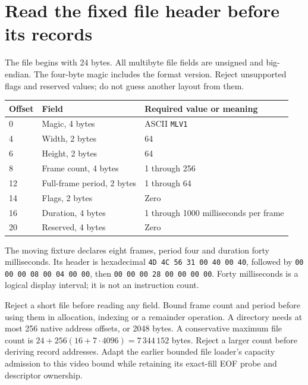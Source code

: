 \section{Read the fixed file header before its records}
The file begins with 24 bytes. All multibyte file fields are unsigned and big-endian.
The four-byte magic includes the format version. Reject unsupported flags and
reserved values; do not guess another layout from them.
\begin{longtable}{p{18mm}p{42mm}p{86mm}}
  \toprule Offset & Field                      & Required value or meaning             \\\midrule
  0               & Magic, 4 bytes             & ASCII \texttt{MLV1}                   \\
  4               & Width, 2 bytes             & 64                                    \\
  6               & Height, 2 bytes            & 64                                    \\
  8               & Frame count, 4 bytes       & 1 through 256                         \\
  12              & Full-frame period, 2 bytes & 1 through 64                          \\
  14              & Flags, 2 bytes             & Zero                                  \\
  16              & Duration, 4 bytes          & 1 through 1000 milliseconds per frame \\
  20              & Reserved, 4 bytes          & Zero                                  \\\bottomrule
\end{longtable}
The moving fixture declares eight frames, period four and duration forty milliseconds.
Its header is hexadecimal \texttt{4D 4C 56 31 00 40 00 40}, followed by
\texttt{00 00 00 08 00 04 00 00}, then \texttt{00 00 00 28 00 00 00 00}.
Forty milliseconds is a logical display interval; it is not an instruction count.

Reject a short file before reading any field. Bound frame count and period before
using them in allocation, indexing or a remainder operation. A directory needs at
most 256 native address offsets, or 2048 bytes. A conservative maximum file count
is $24+256(16+7\cdot4096)=7\,344\,152$ bytes. Reject a larger count before deriving
record addresses. Adapt the earlier bounded file loader's capacity admission to
this video bound while retaining its exact-fill EOF probe and descriptor ownership.
